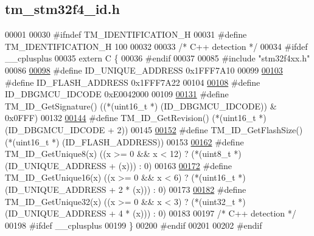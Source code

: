 \hypertarget{tm__stm32f4__id_8h_source}{}\subsection{tm\+\_\+stm32f4\+\_\+id.\+h}

\begin{DoxyCode}
00001 
00030 \textcolor{preprocessor}{#ifndef TM\_IDENTIFICATION\_H}
00031 \textcolor{preprocessor}{#define TM\_IDENTIFICATION\_H 100}
00032 
00033 \textcolor{comment}{/* C++ detection */}
00034 \textcolor{preprocessor}{#ifdef \_\_cplusplus}
00035 \textcolor{keyword}{extern} C \{
00036 \textcolor{preprocessor}{#endif}
00037 
00085 \textcolor{preprocessor}{#include "stm32f4xx.h"}
00086 
\hypertarget{tm__stm32f4__id_8h_source_l00098}{}\hyperlink{group___t_m___i_d___macros_ga631ce0b70a16d3e71bb83d4ad88552c2}{00098} \textcolor{preprocessor}{#define ID\_UNIQUE\_ADDRESS       0x1FFF7A10}
00099 
\hypertarget{tm__stm32f4__id_8h_source_l00103}{}\hyperlink{group___t_m___i_d___macros_ga95fa471f6d9518cbf3228a2a6d69f5a7}{00103} \textcolor{preprocessor}{#define ID\_FLASH\_ADDRESS        0x1FFF7A22}
00104 
\hypertarget{tm__stm32f4__id_8h_source_l00108}{}\hyperlink{group___t_m___i_d___macros_gad1789f86a55e8fc3c2c486dacf3df1a6}{00108} \textcolor{preprocessor}{#define ID\_DBGMCU\_IDCODE        0xE0042000}
00109 
\hypertarget{tm__stm32f4__id_8h_source_l00131}{}\hyperlink{group___t_m___i_d___functions_gaef7e65dccfaeaacc4f20c74da8e76d8b}{00131} \textcolor{preprocessor}{#define TM\_ID\_GetSignature()    ((*(uint16\_t *) (ID\_DBGMCU\_IDCODE)) & 0x0FFF)}
00132 
\hypertarget{tm__stm32f4__id_8h_source_l00144}{}\hyperlink{group___t_m___i_d___functions_ga9a440783a624ab0a8411dcb36e8a415d}{00144} \textcolor{preprocessor}{#define TM\_ID\_GetRevision()     (*(uint16\_t *) (ID\_DBGMCU\_IDCODE + 2))}
00145 
\hypertarget{tm__stm32f4__id_8h_source_l00152}{}\hyperlink{group___t_m___i_d___functions_ga6dfec7d283e405bbf6ca0593f9b6d43e}{00152} \textcolor{preprocessor}{#define TM\_ID\_GetFlashSize()    (*(uint16\_t *) (ID\_FLASH\_ADDRESS))}
00153 
\hypertarget{tm__stm32f4__id_8h_source_l00162}{}\hyperlink{group___t_m___i_d___functions_ga66bf1f5c5762fb380eef6f00875faf3d}{00162} \textcolor{preprocessor}{#define TM\_ID\_GetUnique8(x)     ((x >= 0 && x < 12) ? (*(uint8\_t *) (ID\_UNIQUE\_ADDRESS + (x))) : 0)}
00163     
\hypertarget{tm__stm32f4__id_8h_source_l00172}{}\hyperlink{group___t_m___i_d___functions_gaf8c268973e3725a676c8aadc54ba1404}{00172} \textcolor{preprocessor}{#define TM\_ID\_GetUnique16(x)    ((x >= 0 && x < 6) ? (*(uint16\_t *) (ID\_UNIQUE\_ADDRESS + 2 * (x))) : 0)}
00173 
\hypertarget{tm__stm32f4__id_8h_source_l00182}{}\hyperlink{group___t_m___i_d___functions_gaff28a006a5aea7048bafd765c6dc9f3e}{00182} \textcolor{preprocessor}{#define TM\_ID\_GetUnique32(x)    ((x >= 0 && x < 3) ? (*(uint32\_t *) (ID\_UNIQUE\_ADDRESS + 4 * (x))) : 0)}
00183 
00197 \textcolor{comment}{/* C++ detection */}
00198 \textcolor{preprocessor}{#ifdef \_\_cplusplus}
00199 \}
00200 \textcolor{preprocessor}{#endif}
00201 
00202 \textcolor{preprocessor}{#endif}
\end{DoxyCode}

